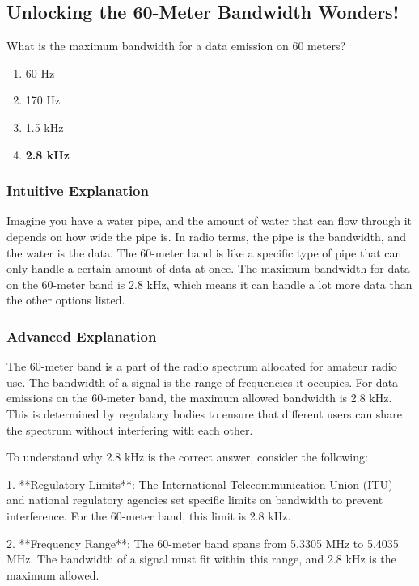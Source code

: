 \subsection{Unlocking the 60-Meter Bandwidth Wonders!}

\begin{tcolorbox}[colback=gray!10!white,colframe=black!75!black,title=E1C01] What is the maximum bandwidth for a data emission on 60 meters?  
    \begin{enumerate}[label=\Alph*)]
        \item 60 Hz
        \item 170 Hz
        \item 1.5 kHz
        \item \textbf{2.8 kHz}
    \end{enumerate}
\end{tcolorbox}

\subsubsection*{Intuitive Explanation}
Imagine you have a water pipe, and the amount of water that can flow through it depends on how wide the pipe is. In radio terms, the pipe is the bandwidth, and the water is the data. The 60-meter band is like a specific type of pipe that can only handle a certain amount of data at once. The maximum bandwidth for data on the 60-meter band is 2.8 kHz, which means it can handle a lot more data than the other options listed.

\subsubsection*{Advanced Explanation}
The 60-meter band is a part of the radio spectrum allocated for amateur radio use. The bandwidth of a signal is the range of frequencies it occupies. For data emissions on the 60-meter band, the maximum allowed bandwidth is 2.8 kHz. This is determined by regulatory bodies to ensure that different users can share the spectrum without interfering with each other.

To understand why 2.8 kHz is the correct answer, consider the following:

1. **Regulatory Limits**: The International Telecommunication Union (ITU) and national regulatory agencies set specific limits on bandwidth to prevent interference. For the 60-meter band, this limit is 2.8 kHz.

2. **Frequency Range**: The 60-meter band spans from 5.3305 MHz to 5.4035 MHz. The bandwidth of a signal must fit within this range, and 2.8 kHz is the maximum allowed.

